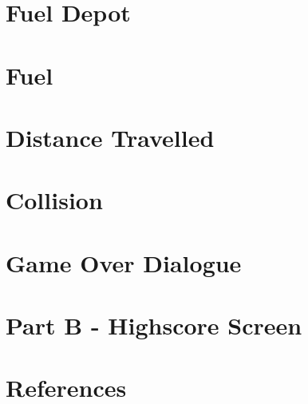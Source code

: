 \documentclass{article}
\begin{document}
\section{Fuel Depot}

\clearpage

\section{Fuel}

\clearpage


\section{Distance Travelled}

\clearpage


\section{Collision}

\clearpage


\section{Game Over Dialogue}

\clearpage

\section{Part B - Highscore Screen}

\clearpage



\section{References}

\clearpage
\end{document}
